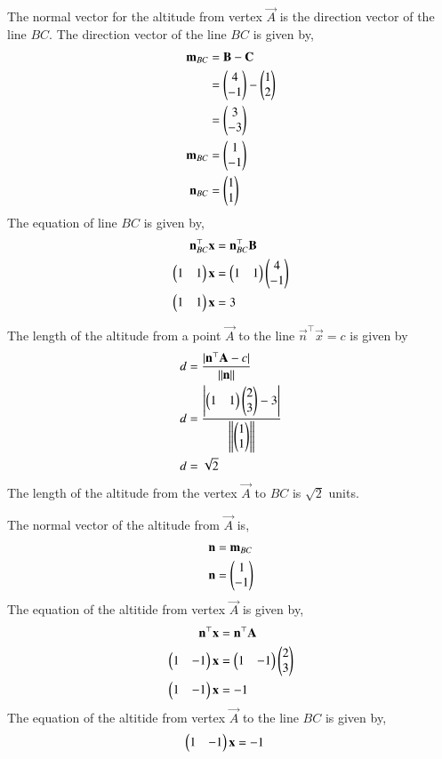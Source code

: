 \documentclass[journal,12pt,twocolumn]{IEEEtran}
\begin{document}
\begin{enumerate}
The normal vector for the altitude from vertex $\vec{A}$ is the direction vector of the line $BC$. The direction vector of the line $BC$ is given by,
\begin{align}
\mathbf{m}_{BC} &= \mathbf{B} - \mathbf{C}\\
&= \begin{pmatrix}4\\-1\end{pmatrix} - \begin{pmatrix}1\\2\end{pmatrix}\\
&= \begin{pmatrix}3\\-3\end{pmatrix} \\
\mathbf{m}_{BC} &= \begin{pmatrix}1\\-1\end{pmatrix}\\
\mathbf{n}_{BC} &= \begin{pmatrix}1\\1\end{pmatrix}
\end{align}
The equation of line $BC$ is given by,
\begin{align}
{\mathbf{n}^{\top}_{BC}}\mathbf{x} &= {\mathbf{n}^{\top}_{BC}}\mathbf{B}\\
\begin{pmatrix}1&1\end{pmatrix}\mathbf{x} &= \begin{pmatrix}1&1\end{pmatrix}\begin{pmatrix}4\\-1\end{pmatrix}\\
\begin{pmatrix}1&1\end{pmatrix}\mathbf{x}  &= 3
\end{align}

The length of the altitude from a point $\vec{A}$ to the line $\vec{n}^{\top}\vec{x} = c$ is given by
\begin{align}
d &= \frac{|\mathbf{n}^{\top}\mathbf{A} - c|}{\left\lVert\mathbf{n}\right\rVert}\\
d &= \frac{\left|\begin{pmatrix}1&1\end{pmatrix}\begin{pmatrix}2\\3\end{pmatrix} - 3\right|}{\left\lVert\begin{pmatrix}1\\1\end{pmatrix}\right\rVert} \\
d &= \sqrt{2}
\end{align}
The length of the altitude from the vertex $\vec{A}$ to $BC$ is $\sqrt{2}$ units.

The normal vector of the altitude from $\vec{A}$ is,
\begin{align}
\mathbf{n} &= \mathbf{m}_{BC}\\
\mathbf{n} &= \begin{pmatrix}1\\-1\end{pmatrix}
\end{align}
The equation of the altitide from vertex $\vec{A}$ is given by,
\begin{align}
\mathbf{n}^{\top}\mathbf{x} &= \mathbf{n}^{\top}\mathbf{A}\\
\begin{pmatrix}1&-1\end{pmatrix}\mathbf{x} &= \begin{pmatrix}1&-1\end{pmatrix}\begin{pmatrix}2\\3\end{pmatrix}\\
\begin{pmatrix}1&-1\end{pmatrix}\mathbf{x} &= -1
\end{align}
The equation of the altitide from vertex $\vec{A}$ to the line $BC$ is given by,
\begin{align}
\begin{pmatrix}1&-1\end{pmatrix}\mathbf{x} &= -1
\end{align}

\end{enumerate}
\end{document}
